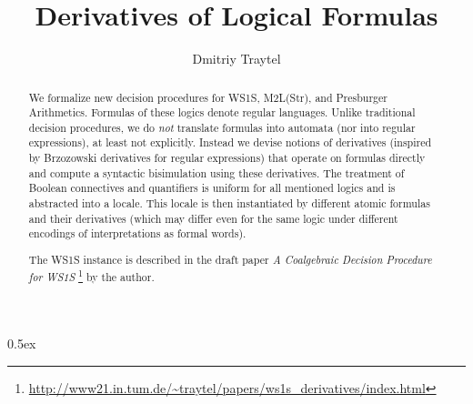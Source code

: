 \documentclass[11pt,a4paper]{article}
\begin{document}
\title{Derivatives of Logical Formulas}
\author{Dmitriy Traytel}
\maketitle
\begin{abstract}
  We formalize new decision procedures for WS1S, M2L(Str), and Presburger
  Arithmetics. Formulas of these logics denote regular languages. Unlike
  traditional decision procedures, we do \emph{not} translate formulas into
  automata (nor into regular expressions), at least not explicitly. Instead we
  devise notions of derivatives (inspired by Brzozowski derivatives for regular
  expressions) that operate on formulas directly and compute a syntactic
  bisimulation using these derivatives. The treatment of Boolean connectives and
  quantifiers is uniform for all mentioned logics and is abstracted into a
  locale. This locale is then instantiated by different atomic formulas and
  their derivatives (which may differ even for the same logic under different
  encodings of interpretations as formal words).


  The WS1S instance is described in the draft paper \emph{A Coalgebraic Decision
    Procedure for WS1S}
  \footnote{\url{http://www21.in.tum.de/~traytel/papers/ws1s_derivatives/index.html}}
    by the author.
\end{abstract}

\tableofcontents

\parindent 0pt\parskip 0.5ex



%
%
\end{document}

